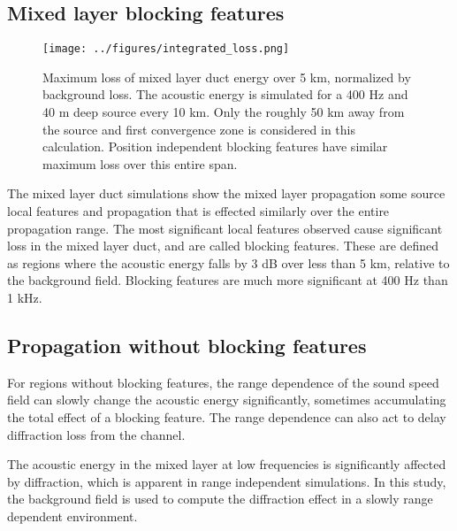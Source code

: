 \documentclass[preprint,NumberedRefs]{JASA}
\begin{document}
\subsection{Mixed layer blocking features}
\begin{figure}
\texttt{[image: ../figures/integrated\_loss.png]}
    \caption{Maximum loss of mixed layer duct energy over 5 km, normalized by background loss. The acoustic energy is simulated for a 400 Hz and 40 m deep source every 10 km. Only the roughly 50 km away from the source and first convergence zone is considered in this calculation. Position independent blocking features have similar maximum loss over this entire span.}
    \label{fig:bg_eng}
\end{figure}

The mixed layer duct simulations show the mixed layer propagation some source  local features and propagation that is effected similarly over the entire propagation range. The most significant local features observed cause significant loss in the mixed layer duct, and are called blocking features. These are defined as regions where the acoustic energy falls by 3 dB over less than 5 km, relative to the background field. Blocking features are much more significant at 400 Hz than 1 kHz.

\subsection{Propagation without blocking features}
For regions without blocking features, the range dependence of the sound speed field can slowly change the acoustic energy significantly, sometimes accumulating the total effect of a blocking feature. The range dependence can also act to delay diffraction loss from the channel.

The acoustic energy in the mixed layer at low frequencies is significantly affected by diffraction, which is apparent in range independent simulations. In this study, the background field is used to compute the diffraction effect in a slowly range dependent environment.



\end{document}
